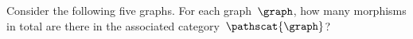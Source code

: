 \vfill\pagebreak

\begin{widepar}
    \begin{gradedexercise}
        \label{ex:HowManyMorphisms}
        Consider the following five graphs.
        For each graph~$\graph$, how many morphisms in total are there in the associated category~$\pathscat{\graph}$?
    \end{gradedexercise}
\end{widepar}

